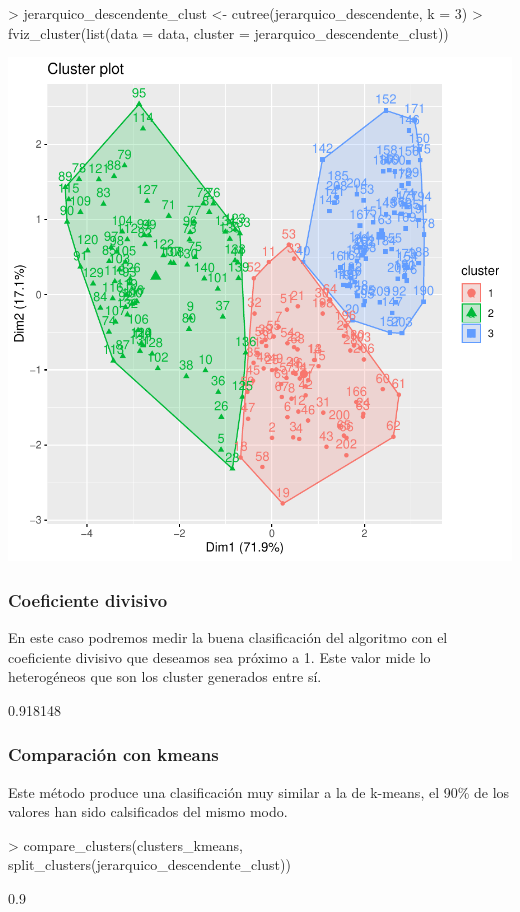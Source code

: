\documentclass [a4paper] {article}
\begin{document}
\begin{center}
\begin{Schunk}
\begin{Sinput}
> jerarquico_descendente_clust <- cutree(jerarquico_descendente, k = 3)
> fviz_cluster(list(data = data, cluster = jerarquico_descendente_clust))
\end{Sinput}
\end{Schunk}
\includegraphics{entrega-jerarquico_descendente_plot}
\end{center}

\subsubsection{Coeficiente divisivo}
En este caso podremos medir la buena clasificación del algoritmo con el coeficiente divisivo que deseamos sea próximo a 1.
Este valor mide lo heterogéneos que son los cluster generados entre sí.
\begin{Schunk}
\begin{Soutput}
[1] 0.918148
\end{Soutput}
\end{Schunk}

\subsubsection{Comparación con kmeans}
Este método produce una clasificación muy similar a la de k-means, el 90\% de los valores han sido calsificados del mismo modo.
\begin{Schunk}
\begin{Sinput}
> compare_clusters(clusters_kmeans, split_clusters(jerarquico_descendente_clust))
\end{Sinput}
\begin{Soutput}
[1] 0.9
\end{Soutput}
\end{Schunk}
\end{document}
